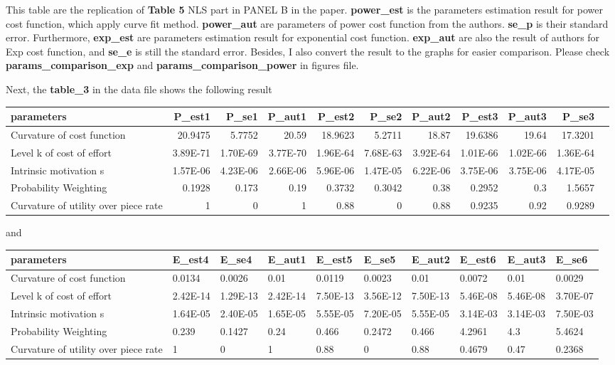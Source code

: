 \documentclass[11pt
]{article}
\begin{document}
This table are the replication of \textbf{Table 5} NLS part in PANEL B
in the paper. \textbf{power\_est} is the parameters estimation result for
power cost function, which apply curve fit method. \textbf{power\_aut}
are parameters of power cost function from the authors. \textbf{se\_p}
is their standard error. Furthermore, \textbf{exp\_est} are parameters
estimation result for exponential cost function. \textbf{exp\_aut} are
also the result of authors for Exp cost function, and \textbf{se\_e} is
still the standard error. Besides, I also convert the result to the
graphs for easier comparison. Please check
\textbf{params\_comparison\_exp} and \textbf{params\_comparison\_power}
in figures file.

Next, the \textbf{table\_3} in the data file shows the following result

{\setlength\tabcolsep{2.5pt}\small
\begin{longtable}{l*{10}{r}}
\toprule()
parameters & P\_est1 & P\_se1 & P\_aut1 & P\_est2 & P\_se2 & P\_aut2 &
P\_est3 & P\_aut3 & P\_se3 \\
\midrule()
\endhead
Curvature of cost function & 20.9475 & 5.7752 & 20.59 & 18.9623 & 5.2711
& 18.87 & 19.6386 & 19.64 & 17.3201 \\
Level k of cost of effort & 3.89E-71 & 1.70E-69 & 3.77E-70 & 1.96E-64 &
7.68E-63 & 3.92E-64 & 1.01E-66 & 1.02E-66 & 1.36E-64 \\
Intrinsic motivation s & 1.57E-06 & 4.23E-06 & 2.66E-06 & 5.96E-06 &
1.47E-05 & 6.22E-06 & 3.75E-06 & 3.75E-06 & 4.17E-05 \\
Probability Weighting & 0.1928 & 0.173 & 0.19 & 0.3732 & 0.3042 & 0.38 &
0.2952 & 0.3 & 1.5657 \\
Curvature of utility over piece rate & 1 & 0 & 1 & 0.88 & 0 & 0.88 &
0.9235 & 0.92 & 0.9289 \\
\bottomrule()
\end{longtable}


and

\begin{longtable}[]{@{}llllllllll@{}}
\toprule()
parameters & E\_est4 & E\_se4 & E\_aut1 & E\_est5 & E\_se5 & E\_aut2 &
E\_est6 & E\_aut3 & E\_se6 \\
\midrule()
\endhead
Curvature of cost function & 0.0134 & 0.0026 & 0.01 & 0.0119 & 0.0023 &
0.01 & 0.0072 & 0.01 & 0.0029 \\
Level k of cost of effort & 2.42E-14 & 1.29E-13 & 2.42E-14 & 7.50E-13 &
3.56E-12 & 7.50E-13 & 5.46E-08 & 5.46E-08 & 3.70E-07 \\
Intrinsic motivation s & 1.64E-05 & 2.40E-05 & 1.65E-05 & 5.55E-05 &
7.20E-05 & 5.55E-05 & 3.14E-03 & 3.14E-03 & 7.50E-03 \\
Probability Weighting & 0.239 & 0.1427 & 0.24 & 0.466 & 0.2472 & 0.466 &
4.2961 & 4.3 & 5.4624 \\
Curvature of utility over piece rate & 1 & 0 & 1 & 0.88 & 0 & 0.88 &
0.4679 & 0.47 & 0.2368 \\
\bottomrule()
\end{longtable}

}
\end{document}
